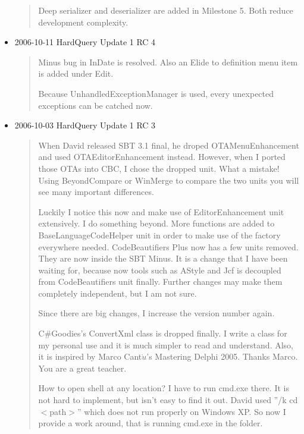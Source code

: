 \begin{itemize}
\begin{quotation}
    Deep serializer and deserializer are added in Milestone 5. Both reduce
    development complexity.
  \end{quotation}

  \item 2006-10-11 HardQuery Update 1 RC 4
  \begin{quotation}
    Minus bug in InDate is resolved. Also an Elide to definition menu item is
    added under Edit.

    Because UnhandledExceptionManager is used, every unexpected exceptions can
    be catched now.
  \end{quotation}
  \item 2006-10-03 HardQuery Update 1 RC 3
  \begin{quotation}
    When David released SBT 3.1 final, he droped OTAMenuEnhancement and used
    OTAEditorEnhancement instead. However, when I ported those OTAs into CBC, I
    chose the dropped unit. What a mistake! Using BeyondCompare or WinMerge to
    compare the two units you will see many important differences.

    Luckily I notice this now and make use of EditorEnhancement unit
    extensively. I do something beyond. More functions are added to
    BaseLanguageCodeHelper unit in order to make use of the factory everywhere
    needed. CodeBeautifiers Plus now has a few units removed. They are now
    inside the SBT Minus. It is a change that I have been waiting for, because
    now tools such as AStyle and Jcf is decoupled from CodeBeautifiers unit
    finally. Further changes may make them completely independent, but I am not
    sure.

    Since there are big changes, I increase the version number again.

    C\#Goodies's ConvertXml class is dropped finally. I write a class for my
    personal use and it is much simpler to read and understand. Also, it is
    inspired by Marco Cant$\grave{u}$'s Mastering Delphi 2005. Thanks Marco.
    You are a great teacher.

    How to open shell at any location? I have to run cmd.exe there. It is not
    hard to implement, but isn't easy to find it out. David used ''/k cd
    $<$path$>$'' which does not run properly on Windows XP. So now I provide a
    work around, that is running cmd.exe in the folder.


\end{quotation}
\end{itemize}

